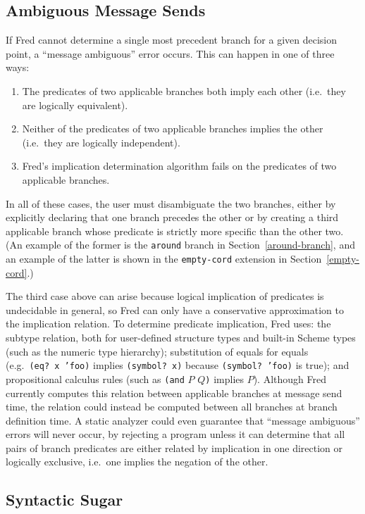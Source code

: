 \documentclass{acm_proc_article-sp}
\newcommand{\code}[1]{\texttt{#1}}
\begin{document}
\subsection{Ambiguous Message Sends}

If Fred cannot determine a single most precedent branch for a given
decision point, a ``message ambiguous'' error occurs.  This can happen
in one of three ways:
\begin{enumerate}
\item The predicates of two applicable branches both imply each other
      (i.e.~they are logically equivalent).
\item Neither of the predicates of two applicable branches implies the
      other (i.e.~they are logically independent).
\item Fred's implication determination algorithm fails on the
      predicates of two applicable branches.
\end{enumerate}
In all of these cases, the user must disambiguate the two branches,
either by explicitly declaring that one branch precedes the other or
by creating a third applicable branch whose predicate is strictly more
specific than the other two.  (An example of the former is the
\code{around} branch in Section~\ref{around-branch}, and an example of 
the latter is shown in the \code{empty-cord} extension in
Section~\ref{empty-cord}.)

The third case above can arise because logical implication of
predicates is undecidable in general, so Fred can only have a
conservative approximation to the implication relation.  To determine
predicate implication, Fred uses: the subtype relation, both for
user-defined structure types and built-in Scheme types (such as the
numeric type hierarchy); substitution of equals for equals
(e.g.~\code{(eq?\ x 'foo)} implies \code{(symbol?\ x)} because
\code{(symbol?\ 'foo)} is true); and propositional calculus rules (such
as \code{(and} $P$ $Q$\code{)} implies \code{$P$}).  Although Fred
currently computes this relation between applicable branches at
message send time, the relation could instead be computed between all
branches at branch definition time.  A static analyzer could even
guarantee that ``message ambiguous'' errors will never occur, by
rejecting a program unless it can determine that all pairs of branch
predicates are either related by implication in one direction or
logically exclusive, i.e.~one implies the negation of the other.

\subsection{Syntactic Sugar}
\end{document}
